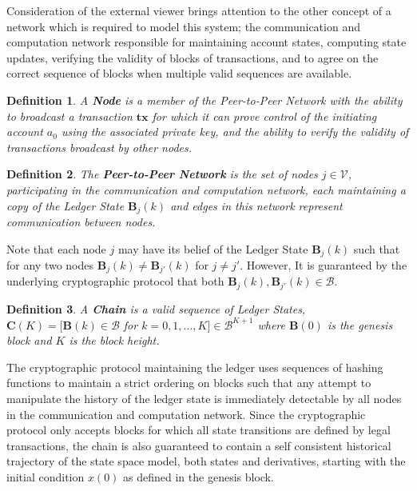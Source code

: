 \documentclass[letterpaper, 10 pt, conference]{ieeeconf}  %
\newtheorem{definition}{Definition}
\begin{document}
Consideration of the external viewer brings attention to the other concept of a network which is required to model this system; the communication and computation network responsible for maintaining account states, computing state updates, verifying the validity of blocks of transactions, and to agree on the correct sequence of blocks when multiple valid sequences are available.

\begin{definition}
A \textbf{Node} is a member of the Peer-to-Peer Network with the ability to broadcast a transaction $\mathbf{tx}$ for which it can prove control of the initiating account $a_0$ using the associated private key, and the ability to verify the validity of transactions broadcast by other nodes.
\end{definition}

\begin{definition}
The \textbf{Peer-to-Peer Network} is the set of nodes $j\in \mathcal{V}$, participating in the communication and computation network, each maintaining a copy of the Ledger State $\mathbf{B}_j(k)$ and edges in this network represent communication between nodes.  
\end{definition}

Note that each node $j$ may have its belief of the Ledger State $\mathbf{B}_j(k)$ such that for any two nodes $\mathbf{B}_j(k) \neq \mathbf{B}_{j'}(k)$ for $j\neq j'$. However, It is guaranteed by the underlying cryptographic protocol that both $\mathbf{B}_j(k), \mathbf{B}_{j'}(k) \in \mathcal{B}$. 

\begin{definition} 
A \textbf{Chain} is a valid sequence of Ledger States, $\mathbf{C}(K) =[\mathbf{B}(k)\in \mathcal{B}$ for $k=0,1,\ldots,K] \in \mathcal{B}^{K+1} $ where $\mathbf{B}(0)$ is the genesis block and $K$ is the block height.
\end{definition}

The cryptographic protocol maintaining the ledger uses sequences of hashing functions to maintain a strict ordering on blocks such that any attempt to manipulate the history of the ledger state is immediately detectable by all nodes in the communication and computation network. Since the cryptographic protocol only accepts blocks for which all state transitions are defined by legal transactions, the chain is also guaranteed to contain a self consistent historical trajectory of the state space model, both states and derivatives, starting with the initial condition $x(0)$ as defined in the genesis block. 
\end{document}
